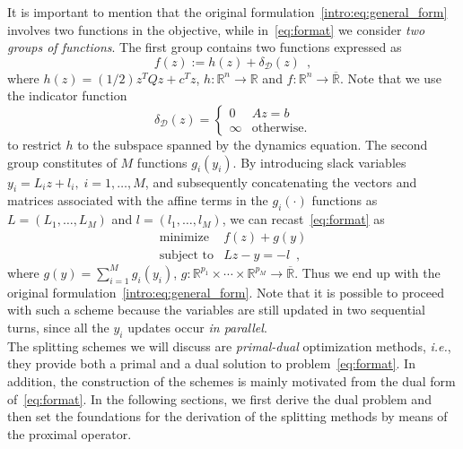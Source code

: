 \documentclass[openany]{now}
\newcommand{\ie}{{\it i.e.}}
\newcommand{\reals}{{\mathbb R}}
\begin{document}
It is important to mention that the original formulation~\eqref{intro:eq:general_form} involves two functions in the objective, while in~\eqref{eq:format} we consider \emph{two groups of functions}. The first group contains two functions expressed as 
\begin{equation}
\label{eq:split_f}
 f(z):= h(z) + \delta_{\mathcal{D}}(z)\enspace,
\end{equation} 
where $h(z)=(1/2)z^TQz + c^Tz$, $h:\reals^n\rightarrow\reals$ and $f:\reals^n\rightarrow\overline\reals$. Note that we use the indicator function
\[
\delta_{\mathcal{D}}(z) = \left\{ \begin{array}{ll} 0 & Az=b \\
              \infty & \mbox{otherwise}.
              \end{array} \right.
\]
to restrict $h$ to the subspace spanned by the dynamics equation.
  The second group constitutes of $M$ functions $g_i(y_i)$. By introducing slack variables $y_i=L_iz+l_i,\; i=1,\ldots,M$, and subsequently concatenating the vectors and matrices associated with the affine terms in the $g_i(\cdot)$ functions as $L=(L_1,\ldots,L_M)$ and $l=(l_1,\ldots,l_M)$, we can recast~\eqref{eq:format} as
  \begin{equation*}
  \begin{array}{ll}
    \mbox{minimize} & f(z) + g(y) \\
    \mbox{subject to} & Lz - y  = -l\enspace,
  \end{array}
  \end{equation*}
where $g(y)=\sum\limits_{i=1}^M g_i(y_i)$, $g:\reals^{p_1}\times\cdots\times\reals^{p_M}\rightarrow \overline\reals$. Thus we end up with the original formulation~\eqref{intro:eq:general_form}. Note that it is possible to proceed with such a scheme because the variables are still updated in two sequential turns, since all the $y_i$ updates occur \emph{in parallel}.\\

The splitting schemes we will discuss are \emph{primal-dual} optimization methods, \ie, they provide both a primal and a dual solution to problem~\eqref{eq:format}. In addition, the construction of the schemes is mainly motivated from the dual form of~\eqref{eq:format}. In the following sections, we first derive the dual problem and then set the foundations for the derivation of the splitting methods by means of the proximal operator.  
\end{document}

